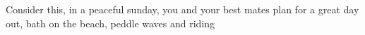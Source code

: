 Consider this, in a peaceful sunday, you and your best mates plan for a great day out, bath on the beach, peddle waves and riding 